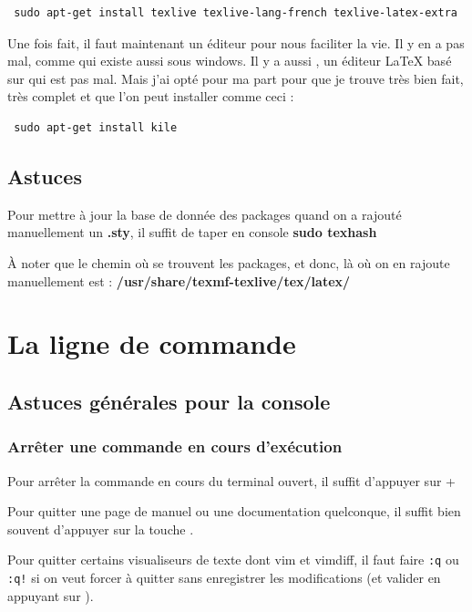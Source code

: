 \documentclass[a4paper,twoside]{article}
\begin{document}
\begin{verbatim}
 sudo apt-get install texlive texlive-lang-french texlive-latex-extra
\end{verbatim}

Une fois fait, il faut maintenant un éditeur pour nous faciliter la vie. Il y en a pas mal, comme  qui existe aussi sous windows. Il y a aussi , un éditeur \LaTeX{} basé sur  qui est pas mal. Mais j'ai opté pour ma part pour  que je trouve très bien fait, très complet et que l'on peut installer comme ceci :
\begin{verbatim}
 sudo apt-get install kile
\end{verbatim}

\subsection{Astuces}

Pour mettre à jour la base de donnée des packages quand on a rajouté manuellement un \textbf{.sty}, il suffit de taper en console \textbf{sudo texhash}

À noter que le chemin où se trouvent les packages, et donc, là où on en rajoute manuellement est : \textbf{/usr/share/texmf-texlive/tex/latex/}

\section{La ligne de commande}
\subsection{Astuces générales pour la console}
\subsubsection{Arrêter une commande en cours d'exécution}
Pour arrêter la commande en cours du terminal ouvert, il suffit d'appuyer sur + 

Pour quitter une page de manuel ou une documentation quelconque, il suffit bien souvent d'appuyer sur la touche . 

Pour quitter certains visualiseurs de texte dont vim et vimdiff, il faut faire \texttt{:q} ou \texttt{:q!} si on veut forcer à quitter sans enregistrer les modifications (et valider en appuyant sur ).
\end{document}
